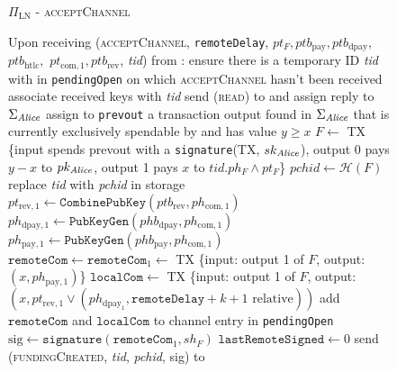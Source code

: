 \begin{figure}[H]
  \begin{protocolbox}{$\Pi_{\mathrm{LN}}$ - \textsc{acceptChannel}}
    \begin{algorithmic}[1]
      \State Upon receiving (\textsc{acceptChannel}, \texttt{remoteDelay},
      $pt_F, ptb_{\mathrm{pay}}, ptb_{\mathrm{dpay}},$ $ptb_{\mathrm{htlc}},$
      $pt_{\mathrm{com}, 1}, ptb_{\mathrm{rev}}$, \textit{tid}) from \bob:
      \Indent
        \State ensure there is a temporary ID \textit{tid} with \bob{} in
        \texttt{pendingOpen} on which \textsc{acceptChannel} hasn't been
        received
        \State associate received keys with \textit{tid}
        \State send (\textsc{read}) to \ledger{} and assign reply to
        $\Sigma_{\mathit{Alice}}$
        \State assign to \texttt{prevout} a transaction output found in
        $\Sigma_{\mathit{Alice}}$ that is currently exclusively spendable by \alice{}
        and has value $y \geq x$
        \State $F \gets$ TX \{input spends prevout with a \texttt{signature}(TX,
        $sk_{\mathit{Alice}}$), output 0 pays $y - x$ to $pk_{\mathit{Alice}}$, output 1 pays
        $x$ to $\textit{tid}.ph_F \wedge pt_F$\}
        \State $\mathit{pchid} \gets \mathcal{H}\left(F\right)$
        \State replace \textit{tid} with \textit{pchid} in storage
        \State $pt_{\mathrm{rev}, 1} \gets
        \mathtt{CombinePubKey}\left(ptb_{\mathrm{rev}}, ph_{\mathrm{com},
        1}\right)$
        \State $ph_{\mathrm{dpay}, 1} \gets
        \texttt{PubKeyGen}\left(phb_{\mathrm{dpay}}, ph_{\mathrm{com},
        1}\right)$
        \State $ph_{\mathrm{pay}, 1} \gets
        \texttt{PubKeyGen}\left(phb_{\mathrm{pay}}, ph_{\mathrm{com}, 1}\right)$
        \State $\mathtt{remoteCom} \gets \mathtt{remoteCom}_1 \gets$ TX \{input:
        output 1 of $F$, output: $\left(x, ph_{\mathrm{pay}, 1}\right)$\}
        \State $\mathtt{localCom} \gets$ TX \{input: output 1 of $F$, output:
        $\left(x, pt_{\mathrm{rev}, 1} \vee \left(ph_{\mathrm{dpay}_1},
        \mathtt{remoteDelay} + k + 1 \text{ relative}\right)\right)$
        \State add $\mathtt{remoteCom}$ and $\mathtt{localCom}$ to channel entry
        in \texttt{pendingOpen}
        \State $\mathrm{sig} \gets \mathtt{signature}\left(\mathtt{remoteCom}_1,
        sh_F\right)$
        \State $\mathtt{lastRemoteSigned} \gets 0$
        \State send (\textsc{fundingCreated}, \textit{tid},
        \textit{pchid}, sig) to \bob{}
      \EndIndent
    \end{algorithmic}
  \end{protocolbox}
  \caption{}
  \label{alg:protocol:open:acceptChannel}
\end{figure}

